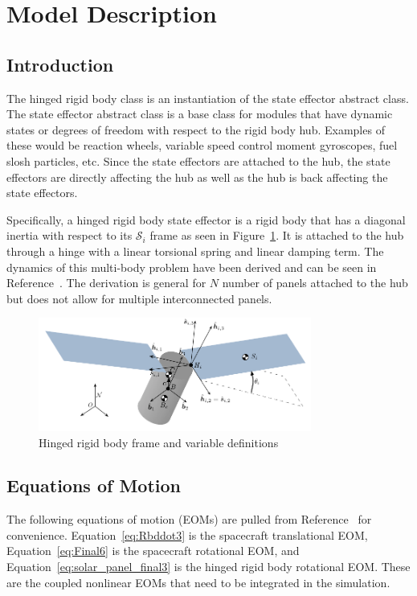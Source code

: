 \section{Model Description}

\subsection{Introduction}

The hinged rigid body class is an instantiation of the state effector abstract class. The state effector abstract class is a base class for modules that have dynamic states or degrees of freedom with respect to the rigid body hub. Examples of these would be reaction wheels, variable speed control moment gyroscopes, fuel slosh particles, etc. Since the state effectors are attached to the hub, the state effectors are directly affecting the hub as well as the hub is back affecting the state effectors.

Specifically, a hinged rigid body state effector is a rigid body that has a diagonal inertia with respect to its $\mathcal{S}_i$ frame as seen in Figure~\ref{fig:FlexFigure}. It is attached to the hub through a hinge with a linear torsional spring and linear damping term. The dynamics of this multi-body problem have been derived and can be seen in Reference~\cite{Allard2016rz}. The derivation is general for $N$ number of panels attached to the hub but does not allow for multiple interconnected panels. 

\begin{figure}[htbp]
	\centerline{
		\includegraphics[width=0.8\textwidth]{Figures/Fig4_4_2}}
	\caption{Hinged rigid body frame and variable definitions}
	\label{fig:FlexFigure}
\end{figure}

\subsection{Equations of Motion}

The following equations of motion (EOMs) are pulled from Reference~\cite{Allard2016rz} for convenience. Equation~\eqref{eq:Rbddot3} is the spacecraft translational EOM, Equation~\eqref{eq:Final6} is the spacecraft rotational EOM, and Equation~\eqref{eq:solar_panel_final3} is the hinged rigid body rotational EOM. These are the coupled nonlinear EOMs that need to be integrated in the simulation. 

